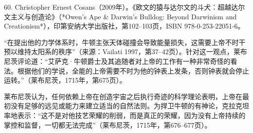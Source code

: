 60. Christopher Ernest Cosans（2009年）。《欧文的猿与达尔文的斗犬：超越达尔文主义与创造论》（*Owen's Ape & Darwin's Bulldog: Beyond Darwinism and Creationism*），印第安纳大学出版社，第102–103页，ISBN 978-0-253-22051-6。  

“在提出他的力学体系时，牛顿主张天体碰撞会导致能量损失，这需要上帝不时干预以维持太阳系的秩序”（来源：Vailati 1997，第37–42页）。针对这一观点，莱布尼茨评论道：“艾萨克·牛顿爵士及其追随者对上帝的工作有一种非常奇怪的看法。根据他们的学说，全能的上帝需要不时为他的钟表上发条，否则钟表就会停止运转。”（莱布尼茨，1715年，第675页）。  

莱布尼茨认为，任何依赖上帝在创造宇宙之后执行奇迹的科学理论表明，上帝在最初没有足够的远见或能力来建立适当的自然法则。为捍卫牛顿的有神论，克拉克坦率地表示：“这不是对他技艺荣耀的削弱，而是真正的荣耀，因为没有上帝持续的掌控和监督，一切都无法完成”（莱布尼茨，1715年，第676–677页）。  

